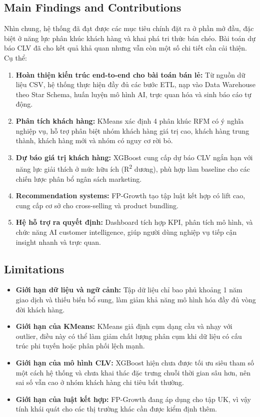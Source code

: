 \documentclass[a4paper,12pt]{article}
\begin{document}
\subsection{Main Findings and Contributions}
Nhìn chung, hệ thống đã đạt được các mục tiêu chính đặt ra ở phần mở đầu, đặc biệt ở năng lực phân khúc khách hàng và khai phá tri thức bán chéo. Bài toán dự báo CLV đã cho kết quả khả quan nhưng vẫn còn một số chi tiết cần cải thiện. Cụ thể:
\begin{enumerate}
    \item \textbf{Hoàn thiện kiến trúc end-to-end cho bài toán bán lẻ:} Từ nguồn dữ liệu CSV, hệ thống thực hiện đầy đủ các bước ETL, nạp vào Data Warehouse theo Star Schema, huấn luyện mô hình AI, trực quan hóa và sinh báo cáo tự động.
    \item \textbf{Phân tích khách hàng:} KMeans xác định 4 phân khúc RFM có ý nghĩa nghiệp vụ, hỗ trợ phân biệt nhóm khách hàng giá trị cao, khách hàng trung thành, khách hàng mới và nhóm có nguy cơ rời bỏ.
    \item \textbf{Dự báo giá trị khách hàng:} XGBoost cung cấp dự báo CLV ngắn hạn với năng lực giải thích ở mức hữu ích (R\textsuperscript{2} dương), phù hợp làm baseline cho các chiến lược phân bổ ngân sách marketing.
    \item \textbf{Recommendation systems:} FP-Growth tạo tập luật kết hợp có lift cao, cung cấp cơ sở cho cross-selling và product bundling.
    \item \textbf{Hệ hỗ trợ ra quyết định:} Dashboard tích hợp KPI, phân tích mô hình, và chức năng AI customer intelligence, giúp người dùng nghiệp vụ tiếp cận insight nhanh và trực quan.
\end{enumerate}


\subsection{Limitations}
\begin{itemize}
    \item \textbf{Giới hạn dữ liệu và ngữ cảnh:} Tập dữ liệu chỉ bao phủ khoảng 1 năm giao dịch và thiếu biến bổ sung, làm giảm khả năng mô hình hóa đầy đủ vòng đời khách hàng.
    \item \textbf{Giới hạn của KMeans:} KMeans giả định cụm dạng cầu và nhạy với outlier, điều này có thể làm giảm chất lượng phân cụm khi dữ liệu có cấu trúc phi tuyến hoặc phân phối lệch mạnh.
    \item \textbf{Giới hạn của mô hình CLV:} XGBoost hiện chưa được tối ưu siêu tham số một cách hệ thống và chưa khai thác đặc trưng chuỗi thời gian sâu hơn, nên sai số vẫn cao ở nhóm khách hàng chi tiêu bất thường.
    \item \textbf{Giới hạn của luật kết hợp:} FP-Growth đang áp dụng cho tập UK, vì vậy tính khái quát cho các thị trường khác cần được kiểm định thêm.
\end{itemize}
\end{document}
